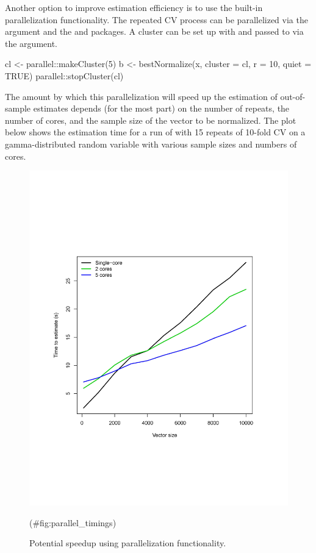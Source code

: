 Another option to improve estimation efficiency is to use the built-in
parallelization functionality. The repeated CV process can be
parallelized via the  argument and the 
and  \citep{doRNG} packages. A cluster can be set up with
 and passed to  via the
 argument.

\begin{Schunk}
\begin{Sinput}
cl <- parallel::makeCluster(5)
b <- bestNormalize(x, cluster = cl, r = 10, quiet = TRUE)
parallel::stopCluster(cl)
\end{Sinput}
\end{Schunk}

The amount by which this parallelization will speed up the estimation of
out-of-sample estimates depends (for the most part) on the number of
repeats, the number of cores, and the sample size of the vector to be
normalized. The plot below shows the estimation time for a run of
 with 15 repeats of 10-fold CV on a
gamma-distributed random variable with various sample sizes and numbers
of cores.

\begin{Schunk}
\begin{figure}

{\centering \includegraphics[width=1\linewidth]{figs/parallel_timings} 

}

\caption[Potential speedup using parallelization functionality]{Potential speedup using parallelization functionality.}(\#fig:parallel_timings)
\end{figure}
\end{Schunk}

